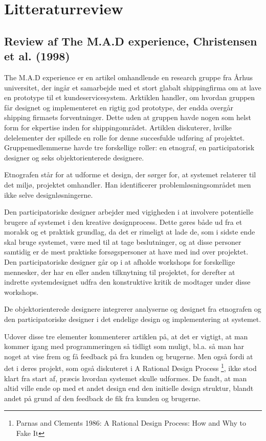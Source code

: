 \documentclass[12pt,a4paper]{article}
\begin{document}
\section{Litteraturreview}
\subsection{Review af The M.A.D experience, Christensen et al. (1998)}
The M.A.D experience er en artikel omhandlende en research gruppe fra Århus universitet, der  ingår et samarbejde med et stort glabalt shippingfirma om at lave en prototype til et kundeservicesystem. 
Arktiklen handler, om hvordan gruppen får designet og implementeret en rigtig god prototype, der endda overgår shipping firmaets forventninger. Dette uden at gruppen havde nogen som helst form for ekpertise inden for shippingområdet.
Artiklen diskuterer, hvilke delelementer der spillede en rolle for denne succesfulde udføring af projektet.
Gruppemedlemmerne havde tre forskellige roller: en etnograf, en participatorisk designer og seks objektorienterede designere. 

Etnografen står for at udforme et design, der sørger for, at systemet relaterer til det miljø, projektet omhandler. Han identificerer problemløsningsområdet men ikke selve designløsningerne.

Den participatoriske designer arbejder med vigigheden i at involvere potentielle brugere af systemet i den kreative designprocess. Dette gøres både ud fra et moralsk og et praktisk grundlag, da det er rimeligt at lade de, som i sidste ende skal bruge systemet, være med til at tage beslutninger, og at disse personer samtidig er de mest praktiske forsøgspersoner at have med ind over projektet. 
Den participatoriske designer går op i at afholde workshops for forskellige mennesker, der har en eller anden tilknytning til projektet, for derefter at indrette systemdesignet udfra den konstruktive kritik de modtager under disse workshops.

De objektorienterede designere integrerer analyserne og designet fra etnografen og den participatoriske designer i det endelige design og implementering at systemet.

Udover disse tre elementer kommenterer artiklen på, at det er vigtigt, at man kommer igang med programmeringen så tidligt som muligt, bl.a. så man har noget at vise frem og få feedback på fra kunden og brugerne. Men også fordi at det i deres projekt, som også diskuteret i A Rational Design Process \footnote{Parnas and Clements 1986: A Rational Design Process: How and Why to Fake It }, ikke stod klart fra start af, præcis hvordan systemet skulle udformes. 
De fandt, at man altid ville ende op med et andet design end den initielle design struktur, blandt andet på grund af den feedback de fik fra kunden og brugerne. 
\end{document}
